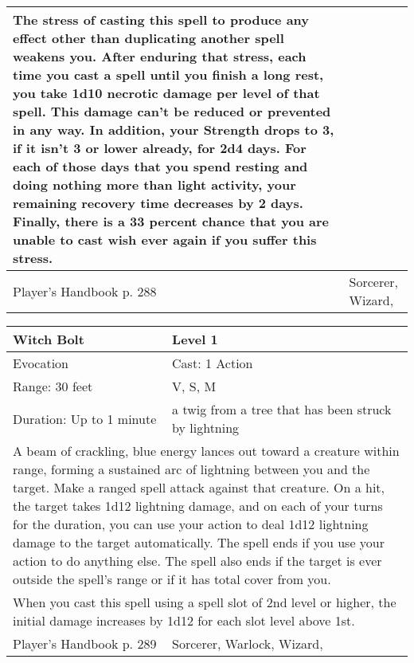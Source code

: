 \documentclass[11pt]{report}
\begin{document}
\begin{table}[H]
\begin{tabular}{||p{6cm}|p{6cm}||}
{The stress of casting this spell to produce any effect other than duplicating another spell weakens you. After enduring that stress, each time you cast a spell until you finish a long rest, you take 1d10 necrotic damage per level of that spell. This damage can’t be reduced or prevented in any way. In addition, your Strength drops to 3, if it isn’t 3 or lower already, for 2d4 days. For each of those days that you spend resting and doing nothing more than light activity, your remaining recovery time decreases by 2 days. Finally, there is a 33 percent chance that you are unable to cast wish ever again if you suffer this stress.}\\ \hline
Player's Handbook p. 288 & Sorcerer, Wizard, \\ \hline\hline
	\end{tabular}
\end{table}

\begin{table}[H]
	\begin{tabular}{||p{6cm}|p{6cm}||}
		\hline\hline
		\bf{Witch Bolt} & Level 1\\ \hline
		Evocation & Cast: 1 Action\\ \hline
		Range: 30 feet & V, S, M\\ \hline
		Duration: Up to 1 minute & a twig from a tree that has been struck by lightning\\ \hline
		\multicolumn{2}{||p{12cm}||}{A beam of crackling, blue energy lances out toward a creature within range, forming a sustained arc of lightning between you and the target.
Make a ranged spell attack against that creature. On a hit, the target takes 1d12 lightning damage, and on each of your turns for the duration, you can use your action to deal 1d12 lightning damage to the target automatically. The spell ends if you use your action to do anything else. The spell also ends if the target is ever outside the spell’s range or if it has total cover from you.}\\ \hline
		\multicolumn{2}{||p{12cm}||}{When you cast this spell using a spell slot of 2nd level or higher, the initial damage increases by 1d12 for each slot level above 1st.}\\ \hline
Player's Handbook p. 289 & Sorcerer, Warlock, Wizard, \\ \hline\hline
	\end{tabular}
\end{table}
\end{document}
